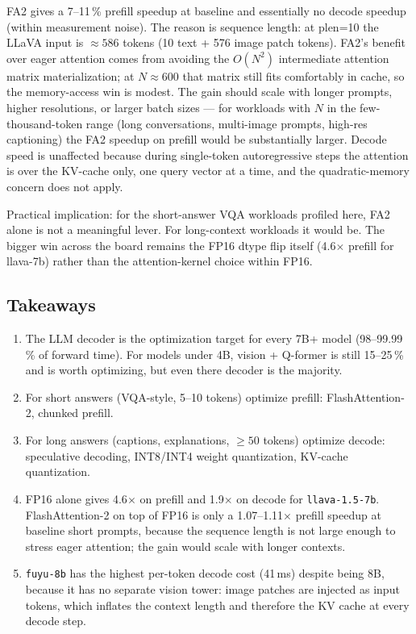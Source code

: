\documentclass[12pt,a4paper]{article}
\begin{document}
FA2 gives a 7--11\,\% prefill speedup at baseline and essentially no decode speedup (within measurement noise). The reason is sequence length: at plen=10 the LLaVA input is $\approx\!586$ tokens (10 text + 576 image patch tokens). FA2's benefit over eager attention comes from avoiding the $O(N^2)$ intermediate attention matrix materialization; at $N \approx 600$ that matrix still fits comfortably in cache, so the memory-access win is modest. The gain should scale with longer prompts, higher resolutions, or larger batch sizes — for workloads with $N$ in the few-thousand-token range (long conversations, multi-image prompts, high-res captioning) the FA2 speedup on prefill would be substantially larger. Decode speed is unaffected because during single-token autoregressive steps the attention is over the KV-cache only, one query vector at a time, and the quadratic-memory concern does not apply.

Practical implication: for the short-answer VQA workloads profiled here, FA2 alone is not a meaningful lever. For long-context workloads it would be. The bigger win across the board remains the FP16 dtype flip itself (4.6$\times$ prefill for llava-7b) rather than the attention-kernel choice within FP16.

\subsection{Takeaways}

\begin{enumerate}[nosep]
  \item The LLM decoder is the optimization target for every 7B+ model (98--99.99\,\% of forward time). For models under 4B, vision + Q-former is still 15--25\,\% and is worth optimizing, but even there decoder is the majority.
  \item For short answers (VQA-style, 5--10 tokens) optimize prefill: FlashAttention-2, chunked prefill.
  \item For long answers (captions, explanations, $\geq 50$ tokens) optimize decode: speculative decoding, INT8/INT4 weight quantization, KV-cache quantization.
  \item FP16 alone gives 4.6$\times$ on prefill and 1.9$\times$ on decode for \texttt{llava-1.5-7b}.  FlashAttention-2 on top of FP16 is only a 1.07--1.11$\times$ prefill speedup at baseline short prompts, because the sequence length is not large enough to stress eager attention; the gain would scale with longer contexts.
  \item \texttt{fuyu-8b} has the highest per-token decode cost (41\,ms) despite being 8B, because it has no separate vision tower: image patches are injected as input tokens, which inflates the context length and therefore the KV cache at every decode step.
\end{enumerate}
\end{document}
